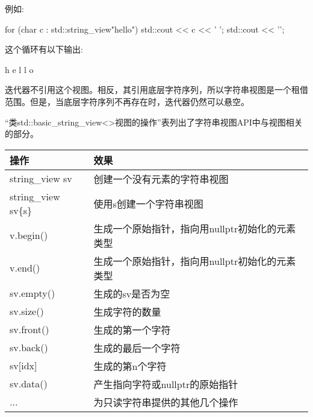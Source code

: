 例如:

\begin{cpp}
for (char c : std::string_view{"hello"}) {
	std::cout << c << ' ';
}
std::cout << '\n';
\end{cpp}

这个循环有以下输出:

\begin{shell}
h e l l o
\end{shell}


迭代器不引用这个视图。相反，其引用底层字符序列，所以字符串视图是一个租借范围。但是，当底层字符序列不再存在时，迭代器仍然可以悬空。


“类std::basic\_string\_view<>视图的操作”表列出了字符串视图API中与视图相关的部分。

\begin{longtable}[c]{|l|l|}
\hline
\textbf{操作}   & \textbf{效果}                                                       \\ \hline
\endfirsthead
%
\endhead
%
string\_view sv      & 创建一个没有元素的字符串视图                                \\ \hline
string\_view sv\{s\} & 使用s创建一个字符串视图                                            \\ \hline
v.begin()            & 生成一个原始指针，指向用nullptr初始化的元素类型 \\ \hline
v.end()              & 生成一个原始指针，指向用nullptr初始化的元素类型 \\ \hline
sv.empty()           & 生成的sv是否为空                                            \\ \hline
sv.size()            & 生成字符的数量                                       \\ \hline
sv.front()           & 生成的第一个字符                                            \\ \hline
sv.back()            & 生成的最后一个字符                                             \\ \hline
sv{[}idx{]}          & 生成的第n个字符                                              \\ \hline
sv.data()            & 产生指向字符或nullptr的原始指针                     \\ \hline
...                  & 为只读字符串提供的其他几个操作               \\ \hline
\end{longtable}

